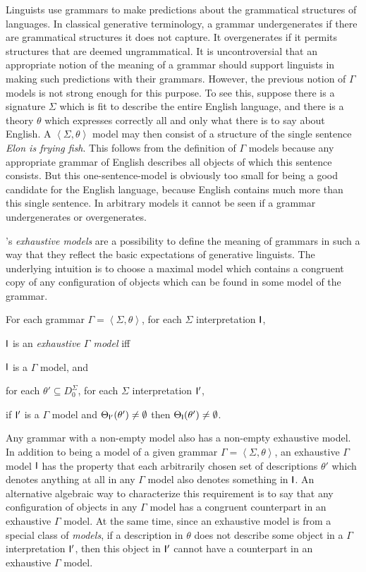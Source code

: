 \documentclass[output=paper
                ,modfonts
                ,nonflat
	        ,collection
	        ,collectionchapter
	        ,collectiontoclongg
 	        ,biblatex
                ,babelshorthands
                ,newtxmath
                ,draftmode
                ,colorlinks, citecolor=brown
]{./langsci/langscibook}
\begin{document}
{Linguists use grammars to make predictions about the grammatical
structures of languages. In classical generative terminology, a
grammar undergenerates if there are grammatical structures it does not
capture. It overgenerates if it permits structures that are deemed
ungrammatical. It is uncontroversial that an appropriate notion of the
meaning of a grammar should support linguists in making such
predictions with their grammars. However, the previous notion of
$\Gamma$ models is not strong enough for this purpose. To see this,
suppose there is a signature $\Sigma$ which is fit to describe the
entire English language, and there is a theory $\theta$ which
expresses correctly all and only what there is to say about English. A
$\left< \Sigma, \theta \right>$ model may then consist of a structure
of the single sentence \emph{Elon is frying fish}.  This follows from
the definition of $\Gamma$ models because any appropriate grammar of
English describes all objects of which this sentence consists. But
this one-sentence-model is obviously too small for being a good
candidate for the English language, because English contains much more
than this single sentence. In arbitrary models it cannot be seen if
a grammar undergenerates or overgenerates.


\citet{King99a-u}'s \emph{exhaustive models} are a possibility to
define the meaning of grammars in such a way that they reflect the
basic expectations of generative linguists. The underlying intuition
is to choose a maximal model which contains a congruent copy of any
configuration of objects which can be found in some model of the grammar.

\begin{mydef}
For each grammar $\Gamma = \left< \Sigma, \theta \right>$,
for each $\Sigma$ interpretation $\mathsf{I}$,

$\mathsf{I}$ is an \emph{exhaustive $\Gamma$ model} iff

$\mathsf{I}$ is a $\Gamma$ model, and

for each \(\theta' \subseteq D_0^{\Sigma}\),
for each $\Sigma$ interpretation $\mathsf{I}'$,

if $\mathsf{I}'$ is a $\Gamma$ model and \(\Theta_{\mathsf{I}'}(\theta') \not= \emptyset\)
then \(\Theta_{\mathsf{I}}(\theta') \not= \emptyset\).
\end{mydef}

Any grammar with a non-empty model also has a non-empty exhaustive
model.
In addition to being a model of a given grammar $\Gamma = \left<
\Sigma, \theta \right>$, an exhaustive $\Gamma$ model $\mathsf{I}$ has the
property that each arbitrarily chosen set of descriptions $\theta'$
which denotes anything at all in any $\Gamma$ model also denotes
something in $\mathsf{I}$. An alternative algebraic way to characterize
this requirement is to say that any configuration of objects in any
$\Gamma$ model has a congruent counterpart in an exhaustive $\Gamma$
model. At the same time, since an exhaustive model is from a special class
of \emph{models}, if a description in $\theta$ does not describe some object in
a $\Gamma$ interpretation $\mathsf{I}'$, then this object in $\mathsf{I}'$ cannot
have a counterpart in an exhaustive $\Gamma$ model.

}
\end{document}
